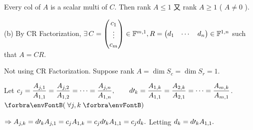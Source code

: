 \documentclass[a4paper, 11pt, UTF8]{article}
\begin{document}
\begin{large}
\par\quad\Ha
{\Large\vspace{6pt}Every col of $A$ is a scalar multi of $C.$ Then rank $A\leqslant 1$ 又 rank $A\geqslant 1$ ( $A\neq 0$ ).}\vspace{6pt}\par\quad
(b) By CR Factorization, $\exists\,C=\begin{pmatrix}c_1 \\ \vdots \\ c_m \end{pmatrix}\in{\mathbb{F}}^{m,1},R=\begin{pmatrix} d_1 & \cdots & d_n\end{pmatrix}\in{\mathbb{F}}^{1,n}$ such that $A=CR.$\vspace{8pt}\par\quad\Hb
\Or Not using CR Factorization. Suppose rank $A=\dim S_c=\dim S_r=1.$\vspace{8pt}\par\quad\Hb
{\Large\vspace{6pt}Let $c_j=\displaystyle\frac{A_{j,1}}{A_{1,1}}=\frac{A_{j,2}}{A_{1,2}}=\dots=\frac{A_{j,n}}{A_{1,n}},\qquad d\prime_k=\frac{A_{1,k}}{A_{1,1}}=\frac{A_{2,k}}{A_{2,1}}=\dots=\frac{A_{m,k}}{A_{m,1}}$.\quad$\Par{\,\forall j,k\,}$}\par\vspace{6pt}\quad\Hb
{\Large\vspace{6pt}$\Rightarrow A_{j,k}=d\prime_k A_{j,1}=c_j A_{1,k}=c_j d\prime_k A_{1,1}=c_j d_k.$ Letting $d_k=d\prime_k A_{1,1}.$}\PfEnd
\SepLine[10pt]


\end{large}
\end{document}
